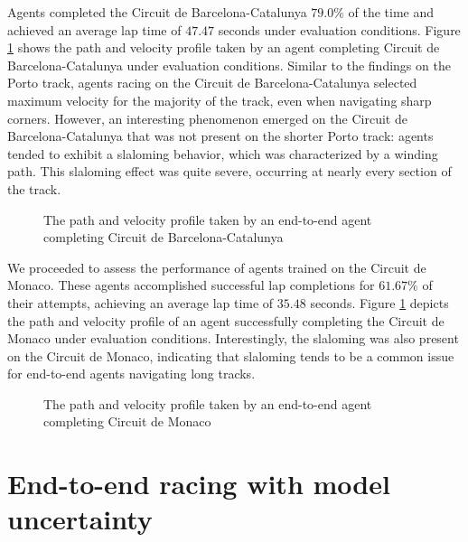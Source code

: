 Agents completed the Circuit de Barcelona-Catalunya $79.0\%$ of the time and achieved an average lap time of $47.47$ seconds under evaluation conditions.
Figure \ref{fig:ete_esp} shows the path and velocity profile taken by an agent completing Circuit de Barcelona-Catalunya under evaluation conditions.
Similar to the findings on the Porto track, agents racing on the Circuit de Barcelona-Catalunya selected maximum velocity for the majority of the track, even when navigating sharp corners. 
However, an interesting phenomenon emerged on the Circuit de Barcelona-Catalunya that was not present on the shorter Porto track: agents tended to exhibit a slaloming behavior, which was characterized by a winding path. 
This slaloming effect was quite severe, occurring at nearly every section of the track.


\begin{figure}[htb!]
    \centering
    
    \caption[The path and velocity profile taken by an end-to-end agent completing Circuit de Barcelona-Catalunya]{The path and velocity profile taken by an end-to-end agent completing Circuit de Barcelona-Catalunya}
    \label{fig:ete_esp}
\end{figure}

We proceeded to assess the performance of agents trained on the Circuit de Monaco. 
These agents accomplished successful lap completions for $61.67\%$ of their attempts, achieving an average lap time of $35.48$ seconds. 
Figure \ref{fig:ete_esp} depicts the path and velocity profile of an agent successfully completing the Circuit de Monaco under evaluation conditions. 
Interestingly, the slaloming was also present on the Circuit de Monaco, indicating that slaloming tends to be a common issue for end-to-end agents navigating long tracks.

\begin{figure}[htb!]
    \centering
    
    \caption[The path and velocity profile taken by an end-to-end agent completing Circuit de Monaco]{The path and velocity profile taken by an end-to-end agent completing Circuit de Monaco}
    \label{fig:ete_mco}
\end{figure}




\section{End-to-end racing with model uncertainty}


